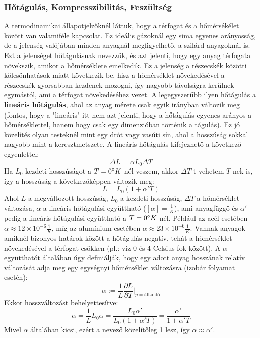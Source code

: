 \documentclass[../main.tex]{subfiles}
\begin{document}
\subsubsection{Hőtágulás, Kompresszibilitás, Feszültség}
A termodinamikai állapotjelzőknél láttuk, hogy a térfogat és a hőmérsékélet között van valamiféle kapcsolat. Ez ideális gázoknál egy sima egyenes arányosság,
de a jelenség valójában minden anyagnál megfigyelhető, a szilárd anyagoknál is. Ezt a jelenséget hőtágulásnak nevezzük, és azt jelenti,
hogy egy anyag térfogata növekszik, amikor a hőmérséklete emelkedik. Ez a jelenség a részecskék közötti kölcsönhatások miatt következik be, hisz a hőmérséklet növekedésével a részecskék gyorsabban kezdenek mozogni,
így nagyobb távolságra kerülnek egymástól, ami a térfogat növekedéséhez vezet. A legegyszerűbb ilyen hőtágulás a \textbf{lineáris hőtágulás}, ahol az anyag mérete csak egyik irányban változik meg (fontos, hogy a "lineáris" itt nem azt jelenti, hogy a hőtágulás egyenes arányos a hőmérséklettel, hanem hogy csak egy dimenzióban történik a tágulás).
Ez jó közelítés olyan testeknél mint egy drót vagy vasúti sín, ahol a hosszúság sokkal nagyobb mint a keresztmetszete. A lineáris hőtágulás kifejezhető a következő egyenlettel:
\begin{equation}
    \Delta L = \alpha L_0 \Delta T
\end{equation}
Ha $L_0$ kezdeti hosszúságot a $T = 0\degree K$-nél veszem, akkor $\Delta T$-t vehetem $T$-nek is, így a hosszúság a következőképpen változik meg:
\begin{equation}
    L = L_0 (1 + \alpha' T)
\end{equation}
Ahol $L$ a megváltozott hosszúság, $L_0$ a kezdeti hosszúság, $\Delta T$ a hőmérséklet változása, $\alpha$ a lineáris hőtágulási együttható ($\left[\alpha\right] = \frac{1}{K}$), ami anyagfüggő és $\alpha'$ pedig a lineáris hőtágulási együttható a $T = 0\degree K$-nél. Például az acél esetében $\alpha \approx 12 \times 10^{-6} \frac{1}{K}$, míg
az alumínium esetében $\alpha \approx 23 \times 10^{-6} \frac{1}{K}$. Vannak anyagok amiknél bizonyos határok között a hőtágulás negatív, tehát a hőmérséklet növekedésével a térfogat csökken (pl.: víz 0 és 4 Celsius fok között).
A $\alpha$ együtthatót általában úgy definiálják, hogy egy adott anyag hosszának relatív változását adja meg egy egységnyi hőmérséklet változásra (izobár folyamat esetén):
\begin{equation}
    \alpha := \frac{1}{L} \frac{\partial L}{\partial T}\bigg|_{p=\text{állandó}}
\end{equation}
Ekkor hosszváltozást behelyettesítve:
\begin{equation}
    \alpha = \frac{1}{L} L_0 \alpha = \frac{L_0 \alpha '}{L_0(1 + \alpha' T)} = \frac{\alpha'}{1 + \alpha' T} 
\end{equation}
Mivel $\alpha$ általában kicsi, ezért a nevező közelítőleg 1 lesz, így $\alpha \approx \alpha'$.
\end{document}
